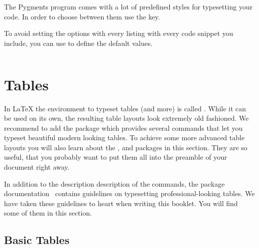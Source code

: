 The Pygments program comes with a lot of predefined styles for typesetting your
code. In order to choose between them use the  key.

To avoid setting the options with every listing with every code snippet you
include, you can use  to define the default values.
\begin{example}
\inputminted{c++}{goodbye.cpp}
\end{example}

\section{Tables}\label{sec:tables}

In \LaTeX{} the environment to typeset tables (and more) is called
. While it can be used on its own, the resulting table layouts look
extremely old fashioned. We recommend to add the  package which
provides several commands that let you typeset beautiful modern looking tables.
To achieve some more advanced table layouts you will also learn about the
,  and  packages in this section.
They are so useful, that you probably want to put them all into the preamble of
your document right away.

In addition to the description description of the commands, the 
package documentation~\cite{pack:booktabs} contains guidelines on typesetting
professional-looking tables. We have taken these guidelines to heart when
writing this booklet. You will find some of them in this section.

\subsection{Basic Tables}

